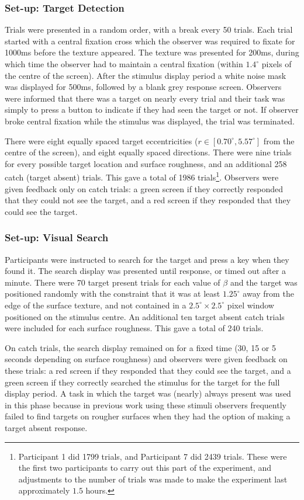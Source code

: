 \documentclass[preprint, authoryear]{elsarticle} %
\begin{document}
\subsubsection{Set-up: Target Detection}
Trials were presented in a random order, with a break every 50 trials. Each trial started with a central fixation cross which the observer was required to fixate for 1000ms before the texture appeared. The texture was presented for 200ms, during which time the observer had to maintain a central fixation (within $1.4^{\circ}$ pixels of the centre of the screen). After the stimulus display period a white noise mask was displayed for 500ms, followed by a blank grey response screen. Observers were informed that there was a target on nearly every trial and their task was simply to press a button to indicate if they had seen the target or not. If observer broke central fixation while the stimulus was displayed, the trial was terminated. 

There were eight equally spaced target eccentricities ($r \in [0.70^{\circ}, 5.57^{\circ}]$ from the centre of the screen), and eight equally spaced directions. There were nine trials for every possible target location and surface roughness, and an additional 258 catch (target absent) trials. This gave a total of 1986 trials\footnote{Participant 1 did 1799 trials, and Participant 7 did 2439 trials. These were the first two participants to carry out this part of the experiment, and adjustments to the number of trials was made to make the experiment last approximately  $1.5$ hours.}.   Observers were given feedback only on catch trials: a green screen if they correctly responded that they could not see the target, and a red screen if they responded that they could see the target.
\par

\subsubsection{Set-up: Visual Search} 

Participants were instructed to search for the target and press a key when they found it. The search display was presented until response, or timed out after a minute. There were 70 target present trials for each value of $\beta$ and the target was positioned randomly with the constraint that it was at least $1.25^{\circ}$ away from the edge of the surface texture, and not contained in a $2.5^{\circ}\times2.5^{\circ}$ pixel window positioned on the stimulus centre. An additional ten target absent catch trials were included for each surface roughness. This gave a total of 240 trials.
\par
On catch trials, the search display remained on for a fixed time (30, 15 or 5 seconds depending on surface roughness) and observers were given feedback on these trials: a red screen if they responded that they could see the target, and a green screen if they correctly searched the stimulus for the target for the full display period. A task in which the target was (nearly) always present was used in this phase because in previous work using these stimuli  \citep{clarke2008} observers frequently failed to find targets on rougher surfaces when they had the option of making a target absent response.
\end{document}
